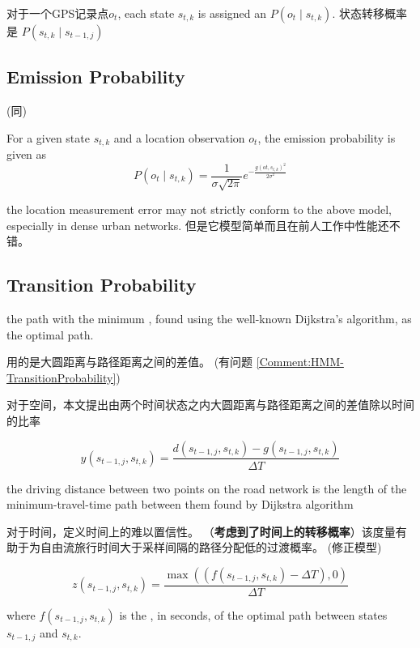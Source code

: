 对于一个GPS记录点$ o_{t} $, each state $ s_{t, k} $ is assigned an  $ P\left(o_{t} \mid s_{t, k}\right) $.  状态转移概率是 $ P\left(s_{t, k} \mid s_{t-1, j}\right) $

\subsection{Emission Probability}

(同\cite{newson2009hidden})

For a given state $ s_{t, k} $ and a location observation $ o_{t} $, the emission probability is given as
$$
P\left(o_{t} \mid s_{t, k}\right)=\frac{1}{\sigma \sqrt{2 \pi}} e^{-\frac{g\left(o t, s_{t, k}\right)^{2}}{2 \sigma^{2}}}
$$

\begin{remark}
    the location measurement error may not strictly conform to the above model, especially in dense urban networks. 但是它模型简单而且在前人工作中性能还不错。 
\end{remark}

\subsection{Transition Probability}

the path with the minimum , found using
the well-known Dijkstra's algorithm, as the optimal path.

\cite{newson2009hidden}用的是大圆距离与路径距离之间的差值。 (有问题 \ref{Comment:HMM-TransitionProbability})

对于空间，本文提出由两个时间状态之内大圆距离与路径距离之间的差值除以时间的比率

$$ y\left(s_{t-1, j}, s_{t, k}\right)=\frac{d\left(s_{t-1, j}, s_{t, k}\right)-g\left(s_{t-1, j}, s_{t, k}\right)}{\Delta T} $$

the driving distance
between two points on the road network is the length of the
minimum-travel-time path between them found by Dijkstra
algorithm

对于时间，定义时间上的难以置信性。 （\textbf{考虑到了时间上的转移概率}）该度量有助于为自由流旅行时间大于采样间隔的路径分配低的过渡概率。 (修正模型)

$$
z\left(s_{t-1, j}, s_{t, k}\right)=\frac{\max \left(\left(f\left(s_{t-1, j}, s_{t, k}\right)-\Delta T\right), 0\right)}{\Delta T}
$$

where $ f\left(s_{t-1, j}, s_{t, k}\right) $ is the , in seconds, of the optimal path between states $ s_{t-1, j} $ and $ s_{t, k} $.

